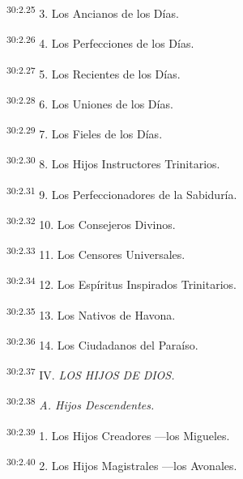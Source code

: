 \par
\textsuperscript{30:2.25} 3. Los Ancianos de los Días.

\par
\textsuperscript{30:2.26} 4. Los Perfecciones de los Días.

\par
\textsuperscript{30:2.27} 5. Los Recientes de los Días.

\par
\textsuperscript{30:2.28} 6. Los Uniones de los Días.

\par
\textsuperscript{30:2.29} 7. Los Fieles de los Días.

\par
\textsuperscript{30:2.30} 8. Los Hijos Instructores Trinitarios.

\par
\textsuperscript{30:2.31} 9. Los Perfeccionadores de la Sabiduría.

\par
\textsuperscript{30:2.32} 10. Los Consejeros Divinos.

\par
\textsuperscript{30:2.33} 11. Los Censores Universales.

\par
\textsuperscript{30:2.34} 12. Los Espíritus Inspirados Trinitarios.

\par
\textsuperscript{30:2.35} 13. Los Nativos de Havona.

\par
\textsuperscript{30:2.36} 14. Los Ciudadanos del Paraíso.

\par
\textsuperscript{30:2.37} IV. \textit{LOS HIJOS DE DIOS.}

\par
\textsuperscript{30:2.38} \textit{A. Hijos Descendentes.}

\par
\textsuperscript{30:2.39} 1. Los Hijos Creadores ---los Migueles.

\par
\textsuperscript{30:2.40} 2. Los Hijos Magistrales ---los Avonales.

